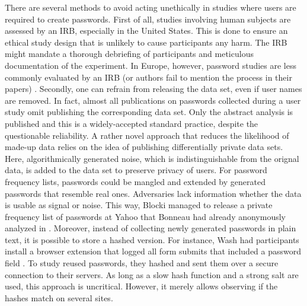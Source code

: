 There are several methods to avoid acting unethically in studies where users are required to create passwords. 
First of all, studies involving human subjects are assessed by an \gls{IRB}, especially in the United States. This is done to ensure an ethical study design that is unlikely to cause participants any harm. The \gls{IRB} might mandate a thorough debriefing of participants and meticulous documentation of the experiment. In Europe, however, password studies are less commonly evaluated by an IRB (or authors fail to mention the process in their papers) \ar. 
Secondly, one can refrain from releasing the data set, even if user names are removed. In fact, almost all publications on passwords collected during a user study omit publishing the corresponding data set. Only the abstract analysis is published and this is a widely-accepted standard practice, despite the questionable reliability. 
A rather novel approach that reduces the likelihood of made-up data relies on the idea of publishing differentially private data sets. Here, algorithmically generated noise, which is indistinguishable from the orignal data, is added to the data set to preserve privacy of users. For password frequency lists, passwords could be mangled and extended by generated passwords that resemble real ones. Adversaries lack information whether the data is usable as signal or noise.
This way, Blocki \etal managed to release a private frequency list of passwords at Yahoo that Bonneau had already anonymously analyzed in \cite{Bonneau2012ScienceOfGuessing}. 
Moreover, instead of collecting newly generated passwords in plain text, it is possible to store a hashed version. For instance, Wash \etal had participants install a browser extension that logged all form submits that included a password field \cite{Wash2016UnderstandingPasswordChoices}. To study reused passwords, they hashed and sent them over a secure connection to their servers. As long as a slow hash function and a strong salt are used, this approach is uncritical. However, it merely allows observing if the hashes match on several sites.
